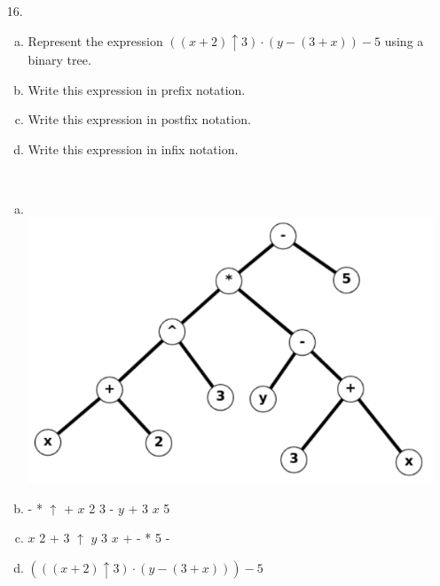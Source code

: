 \begin{itemize}
\item[16.] 
\begin{enumerate}[a.]
\item Represent the expression $((x + 2) \uparrow 3) \cdot (y -(3 + x)) - 5$ using a binary tree.
\item Write this expression in prefix notation.
\item Write this expression in postfix notation.
\item Write this expression in infix notation.
\end{enumerate}
\answer \\
\begin{enumerate}[a.]
    \item \text{}\\
    \includegraphics[scale = 0.7]{img/11_3_16_tree.png}
    \item - * $\uparrow$ + $x$ 2 3 - $y$ + 3 $x$ 5
    \item $x$ 2 + 3 $\uparrow$ $y$ 3 $x$ + - * 5 -
    \item $(((x + 2) \uparrow 3) \cdot (y -(3 + x))) - 5$
\end{enumerate}


\end{itemize}
